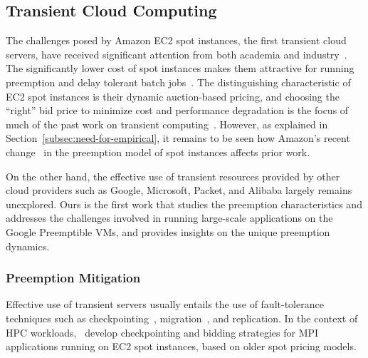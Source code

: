 \subsection{Transient Cloud Computing}

The challenges posed by Amazon EC2 spot instances, the first transient cloud servers, have received significant attention from both academia  and industry~\cite{spotinst}. 
The significantly lower cost of spot instances makes them attractive for running preemption and delay tolerant batch jobs~\cite{spoton, jain14demand, yi2010reducing, conductor, liu-spot, spot-run, dubois2016optispot}.
The distinguishing characteristic of EC2 spot instances is their dynamic auction-based pricing, and choosing the ``right'' bid price to minimize cost and performance degradation is the focus of much of the past work on transient computing~\cite{bidding4,mihailescu2012impact,bidding7,bidding1,bidding8,bidding3,bidding6,bid-cloud,bidding5,wolski_probabilistic_2017, guo_bidding_2015}.
However, as explained in Section~\ref{subsec:need-for-empirical}, it remains to be seen how Amazon's recent change~\cite{bid-change} in the preemption model of spot instances affects prior work. 


On the other hand, the effective use of transient resources provided by other cloud providers such as Google, Microsoft, Packet, and Alibaba largely remains unexplored. 
Ours is the first work that studies the preemption characteristics and addresses the challenges involved in running large-scale applications on the Google Preemptible VMs, and provides insights on the unique preemption dynamics. %

\vspace*{\subsecspace}
\subsubsection{Preemption Mitigation}
Effective use of transient servers usually entails the use of fault-tolerance techniques such as checkpointing~\cite{flint}, migration~\cite{spotcheck}, and replication.
In the context of HPC workloads,~\cite{marathe2014exploiting,gong_monetary_2015,xiang_spotmpi:_2011} develop checkpointing and bidding strategies for MPI applications running on EC2 spot instances, based on older spot pricing models.


